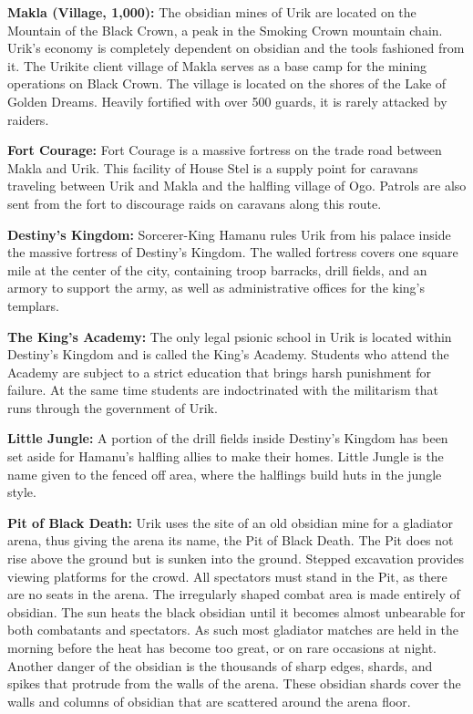 {
	\textbf{Makla (Village, 1,000):} The obsidian mines of Urik are located on the Mountain of the Black Crown, a peak in the Smoking Crown mountain chain. Urik's economy is completely dependent on obsidian and the tools fashioned from it. The Urikite client village of Makla serves as a base camp for the mining operations on Black Crown. The village is located on the shores of the Lake of Golden Dreams. Heavily fortified with over 500 guards, it is rarely attacked by raiders.

	\textbf{Fort Courage:} Fort Courage is a massive fortress on the trade road between Makla and Urik. This facility of House Stel is a supply point for caravans traveling between Urik and Makla and the halfling village of Ogo. Patrols are also sent from the fort to discourage raids on caravans along this route.
}
{
	\textbf{Destiny's Kingdom:} Sorcerer-King Hamanu rules Urik from his palace inside the massive fortress of Destiny's Kingdom. The walled fortress covers one square mile at the center of the city, containing troop barracks, drill fields, and an armory to support the army, as well as administrative offices for the king's templars.

	\textbf{The King's Academy:} The only legal psionic school in Urik is located within Destiny's Kingdom and is called the King's Academy. Students who attend the Academy are subject to a strict education that brings harsh punishment for failure. At the same time students are indoctrinated with the militarism that runs through the government of Urik.

	\textbf{Little Jungle:} A portion of the drill fields inside Destiny's Kingdom has been set aside for Hamanu's halfling allies to make their homes. Little Jungle is the name given to the fenced off area, where the halflings build huts in the jungle style.

	\textbf{Pit of Black Death:} Urik uses the site of an old obsidian mine for a gladiator arena, thus giving the arena its name, the Pit of Black Death. The Pit does not rise above the ground but is sunken into the ground. Stepped excavation provides viewing platforms for the crowd. All spectators must stand in the Pit, as there are no seats in the arena. The irregularly shaped combat area is made entirely of obsidian. The sun heats the black obsidian until it becomes almost unbearable for both combatants and spectators. As such most gladiator matches are held in the morning before the heat has become too great, or on rare occasions at night. Another danger of the obsidian is the thousands of sharp edges, shards, and spikes that protrude from the walls of the arena. These obsidian shards cover the walls and columns of obsidian that are scattered around the arena floor.

}
